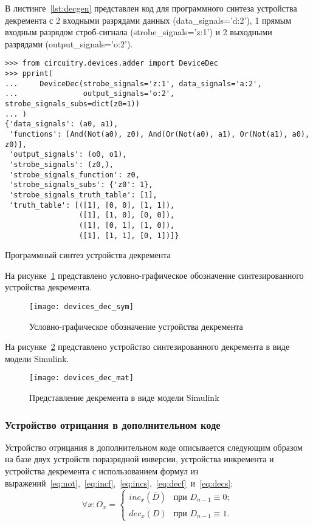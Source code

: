 \documentclass[document.tex]{subfiles}
\begin{document}
\clearpage
В листинге~\ref{lst:decgen} представлен код для программного синтеза
устройства декремента с 2 входными разрядами данных (data\_signals='d:2'), 1
прямым входным разрядом строб-сигнала (strobe\_signals='z:1') и 2 выходными
разрядами (output\_signals='o:2').

\begin{listing}[ht]
\begin{verbatim}
>>> from circuitry.devices.adder import DeviceDec          
>>> pprint(                                                
...     DeviceDec(strobe_signals='z:1', data_signals='a:2',
...               output_signals='o:2', strobe_signals_subs=dict(z0=1))
... )
{'data_signals': (a0, a1),
 'functions': [And(Not(a0), z0), And(Or(Not(a0), a1), Or(Not(a1), a0), z0)],
 'output_signals': (o0, o1),
 'strobe_signals': (z0,),
 'strobe_signals_function': z0,
 'strobe_signals_subs': {'z0': 1},
 'strobe_signals_truth_table': [1],
 'truth_table': [([1], [0, 0], [1, 1]),
                 ([1], [1, 0], [0, 0]),
                 ([1], [0, 1], [1, 0]),
                 ([1], [1, 1], [0, 1])]}
\end{verbatim}
\caption{Программный синтез устройства декремента}
\label{lst:decgen}
\end{listing}

На рисунке~\ref{fig:devicedec} представлено условно-графическое обозначение
синтезированного устройства декремента.

\begin{figure}[here]
\centering
\texttt{[image: devices\_dec\_sym]}
\caption{Условно-графическое обозначение устройства декремента}
\label{fig:devicedec}
\end{figure}

\clearpage

На рисунке~\ref{fig:devicedecmat} представлено устройство
синтезированного декремента в виде модели Simulink.

\begin{figure}[here]
\texttt{[image: devices\_dec\_mat]}
\caption{Представление декремента в виде модели Simulink}
\label{fig:devicedecmat}
\end{figure}

\clearpage
\subsubsection{Устройство отрицания в дополнительном коде}

Устройство отрицания в дополнительном коде описывается следующим образом на базе
двух устройств поразрядной инверсии, устройства инкремента и устройства
декремента с использованием формул из
выражений~\ref{eq:not},~\ref{eq:incf},~\ref{eq:incs},~\ref{eq:decf}~и~\ref{eq:decs}:
\begin{equation}
\label{eq:nego}
\forall x: O_x = \begin{cases}
inc_{x}(\overline{D}) & \mbox{при } D_{n-1} \equiv 0; \\
\overline{dec_{x}(D)} & \mbox{при } D_{n-1} \equiv 1.
\end{cases} 
\end{equation}
\end{document}

